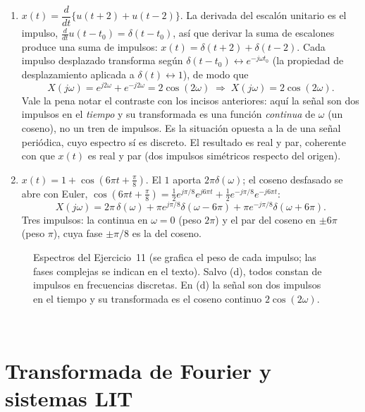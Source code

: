 \documentclass[10pt,a4paper]{article}
\newcommand{\tema}[1]{%
  \bigskip
  \noindent{\color{utnblue}\rule{\linewidth}{1pt}}\\[-0.4em]
  \section*{#1}
  \vspace{-0.6em}
}
\begin{document}
\begin{enumerate}[label=\textbf{\alph*)}]
		\item $x(t)=\dfrac{d}{dt}\{u(t+2)+u(t-2)\}$. La derivada del escalón unitario es el impulso, $\tfrac{d}{dt}u(t-t_0)=\delta(t-t_0)$, así que derivar la suma de escalones produce una suma de impulsos: $x(t)=\delta(t+2)+\delta(t-2)$. Cada impulso desplazado transforma según $\delta(t-t_0)\leftrightarrow e^{-j\omega t_0}$ (la propiedad de desplazamiento aplicada a $\delta(t)\leftrightarrow 1$), de modo que
		\[
			X(j\omega)=e^{j2\omega}+e^{-j2\omega}=2\cos(2\omega) \;\Rightarrow\; \boxed{X(j\omega)=2\cos(2\omega).}
		\]
		Vale la pena notar el contraste con los incisos anteriores: aquí la señal son dos impulsos en el \emph{tiempo} y su transformada es una función \emph{continua} de $\omega$ (un coseno), no un tren de impulsos. Es la situación opuesta a la de una señal periódica, cuyo espectro sí es discreto. El resultado es real y par, coherente con que $x(t)$ es real y par (dos impulsos simétricos respecto del origen).

		\item $x(t)=1+\cos(6\pi t+\tfrac{\pi}{8})$. El $1$ aporta $2\pi\delta(\omega)$; el coseno desfasado se abre con Euler, $\cos(6\pi t+\tfrac{\pi}{8})=\tfrac12 e^{j\pi/8}e^{j6\pi t}+\tfrac12 e^{-j\pi/8}e^{-j6\pi t}$:
		\[
			\boxed{X(j\omega)=2\pi\,\delta(\omega) + \pi e^{j\pi/8}\delta(\omega-6\pi) + \pi e^{-j\pi/8}\delta(\omega+6\pi).}
		\]
		Tres impulsos: la continua en $\omega=0$ (peso $2\pi$) y el par del coseno en $\pm6\pi$ (peso $\pi$), cuya fase $\pm\pi/8$ es la del coseno.
	\end{enumerate}

	\begin{figure}[H]
		\centering
		
		\caption{Espectros del Ejercicio~11 (se grafica el peso de cada impulso; las fases complejas se indican en el texto). Salvo (d), todos constan de impulsos en frecuencias discretas. En (d) la señal son dos impulsos en el tiempo y su transformada es el coseno continuo $2\cos(2\omega)$.}
		\label{fig:sol_ej12}
	\end{figure}

	\tema{Transformada de Fourier y sistemas LIT}
\end{document}
